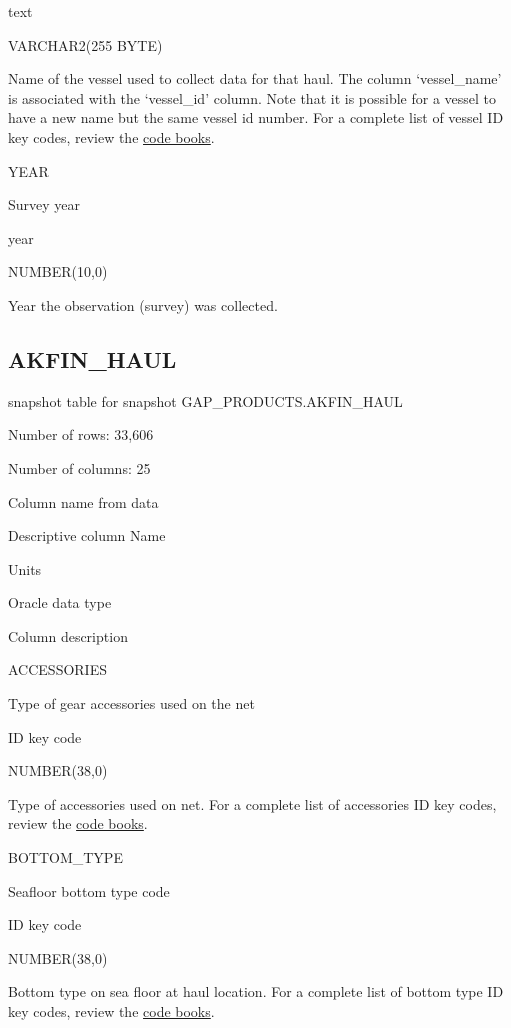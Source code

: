 \documentclass[
  letterpaper,
  oneside,
  open=any]{scrbook}
\begin{document}
text

VARCHAR2(255 BYTE)

Name of the vessel used to collect data for that haul. The column
`vessel\_name' is associated with the `vessel\_id' column. Note that it
is possible for a vessel to have a new name but the same vessel id
number. For a complete list of vessel ID key codes, review the
\href{https://www.fisheries.noaa.gov/resource/document/groundfish-survey-species-code-manual-and-data-codes-manual}{code
books}.

YEAR

Survey year

year

NUMBER(10,0)

Year the observation (survey) was collected.

\hypertarget{akfin_haul}{%
\subsection{AKFIN\_HAUL}\label{akfin_haul}}

snapshot table for snapshot GAP\_PRODUCTS.AKFIN\_HAUL

Number of rows: 33,606

Number of columns: 25

Column name from data

Descriptive column Name

Units

Oracle data type

Column description

ACCESSORIES

Type of gear accessories used on the net

ID key code

NUMBER(38,0)

Type of accessories used on net. For a complete list of accessories ID
key codes, review the
\href{https://www.fisheries.noaa.gov/resource/document/groundfish-survey-species-code-manual-and-data-codes-manual}{code
books}.

BOTTOM\_TYPE

Seafloor bottom type code

ID key code

NUMBER(38,0)

Bottom type on sea floor at haul location. For a complete list of bottom
type ID key codes, review the
\href{https://www.fisheries.noaa.gov/resource/document/groundfish-survey-species-code-manual-and-data-codes-manual}{code
books}.
\end{document}
